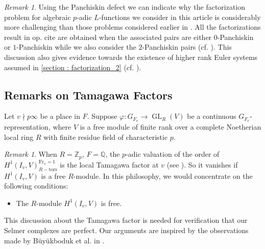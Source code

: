 \documentclass[10pt]{amsart}
\numberwithin{equation}{section}
\theoremstyle{definition}
\theoremstyle{remark} %
\newtheorem{rmk}[thm]{Remark}
\newcommand{\GL}[1]{\operatorname{GL}_{#1}}
\newcommand{\Q}{\mathbb{Q}}
\newcommand{\Z}{\mathbb{Z}}
\begin{document}
	\begin{rmk}
		\label{remark_panchiskin}
		Using the Panchiskin defect we can indicate why the factorization problem for algebraic $p$-adic $L$-functions we consider in this article is considerably more challenging than those problems considered earlier in \cite{Greenberg1982,Palva18,BCS23}. All the factorizations result in op. cite are obtained when the associated pairs are either $ 0 $-Panchiskin or $ 1 $-Panchiskin while we also consider the $ 2 $-Panchiskin pairs (cf. \cite[.2]{BCS23}). This discussion also gives evidence towards the existence of higher rank Euler systems assumed in \cref{section : factorization_2} (cf. \cite{LZ20local}). 
	\end{rmk}
	\subsection{Remarks on Tamagawa Factors}
	\label{sec:tamagawa}
	Let $ v \nmid p\infty $ be a place in $ F $. Suppose $ \varphi \colon G_{F_v} \rightarrow \GL{R}(V) $ be a continuous $ G_{F_v} $-representation, where $ V $ is a free module of finite rank over a complete Noetherian local ring $ R $ with finite residue field of characteristic $ p $. 
	\begin{rmk}
		When $ R = \Z_p $, $ F = \Q $, the $ p $-adic valuation of the order of $ H^1(I_{v},V)^{\mathrm{Fr}_{v}=1}_{R-\mathrm{tors}} $ is the local Tamagawa factor at $ v $ (see \cite[\textsection I.4.2.2]{FPR94}). So it vanishes if $ H^1(I_{v},V) $ is a free $ R $-module. In this philosophy, we would concentrate on the following conditions:
		\begin{itemize}
			\item The $ R $-module $ H^1(I_{v},V) $ is free.
		\end{itemize}
	\end{rmk}
	This discussion about the Tamagawa factor is needed for verification that our Selmer complexes are perfect. Our arguments are inspired by the observations made by Büyükboduk et al. in \cite{BCS23}.
\end{document}
